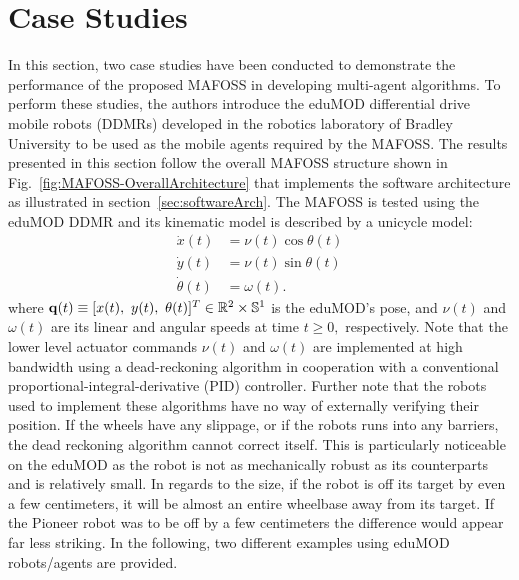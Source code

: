 \section{Case Studies}
\label{sec:caseStudies}
In this section, two case studies have been conducted to demonstrate the performance of the proposed MAFOSS in developing multi-agent algorithms. To perform these studies, the authors introduce the eduMOD differential drive mobile robots (DDMRs) developed in the robotics laboratory of Bradley University to be used as the mobile agents required by the MAFOSS. The results presented in this section follow the overall MAFOSS structure shown in Fig.~\ref{fig:MAFOSS-OverallArchitecture} that implements the software architecture as illustrated in section~\ref{sec:softwareArch}. The MAFOSS is tested using the eduMOD DDMR and its kinematic model is described by a unicycle model: %
%
%
\begin{subequations}
\begin{align}
\dot x(t) &= \nu(t)\cos\theta(t)\\
\dot y(t) &= \nu(t)\sin\theta(t)\\
\dot\theta(t) &= \omega(t).
\end{align}
\label{eq:unicycleModel}
\end{subequations}
%
where ${\bf q}(t) \equiv [x(t),~y(t),~\theta(t)]^T\in\mathbb{R}^2\times\mathbb{S}^1$ is the eduMOD's pose, and $\nu(t)$ and $\omega(t)$ are its linear and angular speeds at time $t\ge 0,$  respectively.
%
Note that the lower level actuator commands $\nu(t)$ and $\omega(t)$ are implemented at high bandwidth using a dead-reckoning algorithm in cooperation with a conventional proportional-integral-derivative (PID) controller. Further note that the robots used to implement these algorithms have no way of externally verifying their position. If the wheels have any slippage, or if the robots runs into any barriers, the dead reckoning algorithm cannot correct itself. This is particularly noticeable on the eduMOD as the robot is not as mechanically robust as its counterparts and is relatively small. In regards to the size, if the robot is off its target by even a few centimeters, it will be almost an entire wheelbase away from its target. If the Pioneer robot was to be off by a few centimeters the difference would appear far less striking. In the following, two different examples using eduMOD robots/agents are provided. 


